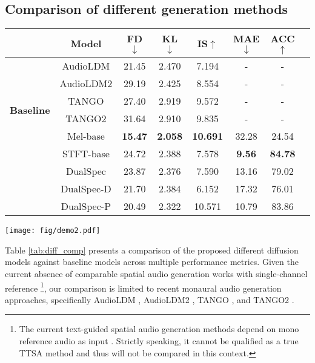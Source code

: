 \documentclass{IEEEtran}
\begin{document}
\subsection{Comparison of different generation methods}

\begin{table*}[ht]
\centering
\caption{Performance comparison of the proposed different models with baselines.}
\setlength{\tabcolsep}{7.1mm}
\begin{tabular}{cccccccc}
\toprule
& \textbf{Model}  & \textbf{FD$\downarrow$} & \textbf{KL$\downarrow$} & \textbf{IS$\uparrow$} & \textbf{MAE$\downarrow$} & \textbf{ACC$\uparrow$} \\
\midrule
\multirow{6}{*}{\textbf{Baseline}}
& AudioLDM \cite{liu2023audioldm} & 21.45 & 2.470 & 7.194 & - & - \\
& AudioLDM2 \cite{liu2024audioldm} & 29.19 & 2.425 & 8.554 & - & - \\
& TANGO \cite{ghosal2023tango} & 27.40 & 2.919 & 9.572& -& - \\
& TANGO2 \cite{majumder2024tango} & 31.64 & 2.910 & 9.835 & - & - \\
\midrule
\multirow{5}{*}{\textbf{Ours}}
& Mel-base & \textbf{15.47} & \textbf{2.058} & \textbf{10.691} & 32.28 & 24.54 \\
& STFT-base & 24.72 & 2.388 & 7.578 & \textbf{9.56} & \textbf{84.78} \\
& DualSpec & 23.87 & 2.376 & 7.590 & 13.16 & 79.02 \\
& DualSpec-D & 21.70 & 2.384 & 6.152 & 17.32 & 76.01 \\
& DualSpec-P & 20.49 & 2.322 & 10.571 & 10.79 & 83.86 \\
\bottomrule
\end{tabular}
\label{tab:diff_comp}
\end{table*}
\begin{figure*}[t]
    \centering
    \texttt{[image: fig/demo2.pdf]}
    \caption{Examples generated by DualSpec-P. The upper section of each example represents the left channel, while the lower section corresponds to the right channel.}
    \label{fig:demo}
\end{figure*}

Table \ref{tab:diff_comp} presents a comparison of the proposed different diffusion models against baseline models across multiple performance metrics. Given the current absence of comparable spatial audio generation works with single-channel reference \footnote{The current text-guided spatial audio generation methods depend on mono reference audio as input \cite{feng2025audiospa}. Strictly speaking, it cannot be qualified as a true TTSA method and thus will not be compared in this context.}, our comparison is limited to recent monaural audio generation approaches, specifically AudioLDM \cite{liu2023audioldm}, AudioLDM2 \cite{liu2024audioldm}, TANGO \cite{ghosal2023tango}, and TANGO2 \cite{majumder2024tango}.
\end{document}
